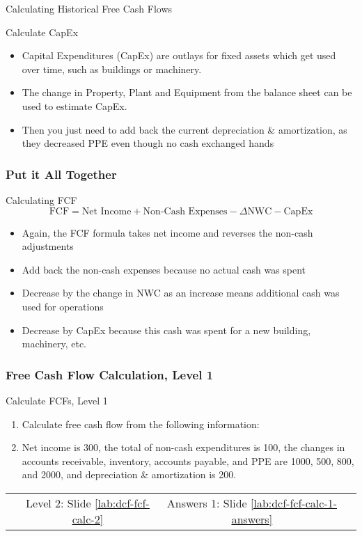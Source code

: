 \documentclass[handout, 11pt]{beamer}
\begin{document}
\begin{section}{Calculating Historical Free Cash Flows}
\begin{frame}
\begin{block}{Calculate CapEx}
\end{block}
\vfill
\begin{itemize}
\item Capital Expenditures (CapEx) are outlays for fixed assets which get used over time, such as buildings or machinery.
\vfill
\item The change in Property, Plant and Equipment from the balance sheet can be used to estimate CapEx.
\vfill
\item Then you just need to add back the current depreciation \& amortization, as they decreased PPE even though no cash exchanged hands
\end{itemize}
\end{frame}
\begin{frame}
\frametitle{Put it All Together}
\begin{block}{Calculating FCF}
\begin{equation}
	\text{FCF} = \text{Net Income} + \text{Non-Cash Expenses} - \Delta\text{NWC} - \text{CapEx}
\end{equation}
\end{block}
\vfill
\begin{itemize}
\item Again, the FCF formula takes net income and reverses the non-cash adjustments
\vfill
\item Add back the non-cash expenses because no actual cash was spent
\vfill
\item Decrease by the change in NWC as an increase means additional cash was used for operations
\vfill
\item Decrease by CapEx because this cash was spent for a new building, machinery, etc.
\end{itemize}
\end{frame}
\begin{frame}
\frametitle{Free Cash Flow Calculation, Level 1}
{
\begin{block}{Calculate FCFs, Level 1}
\begin{enumerate}
\item Calculate free cash flow from the following information:
\item Net income is 300, the total of non-cash expenditures is 100, the changes in accounts receivable, inventory, accounts payable, and PPE are 1000, 500, 800, and 2000, and depreciation \& amortization is 200.
\end{enumerate}
\vfill
\begin{tabular*}{\textwidth}{@{\extracolsep{\fill}}cccc}
\toprule
\hfill & Level 2: Slide \textcolor{blue}{\underline{\ref{lab:dcf-fcf-calc-2}}} & Answers 1: Slide \textcolor{blue}{\underline{\ref{lab:dcf-fcf-calc-1-answers}}} & \hfill\\


\end{tabular*}
\end{block}}
\end{frame}
\end{section}
\end{document}
